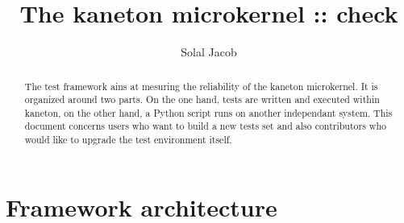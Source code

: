 %
%
%
%
%
%

%
%

%
%

\def\path{../..}

%
%



%
%


%
%

\title{The kaneton microkernel :: check}

%
%

\author{\small{Solal Jacob}}

%
%



%
%

\maketitle

%
%

\begin{abstract}

\indent The test framework ains at mesuring the reliability of the kaneton
microkernel. It is organized around two parts. On the one hand, tests are
written and executed within kaneton, on the other hand, a Python script runs on
another independant system. This document concerns users who want to build a
new tests set and also contributors who would like to upgrade the test
environment itself.

\end{abstract}

%
%

\section{Framework architecture}

